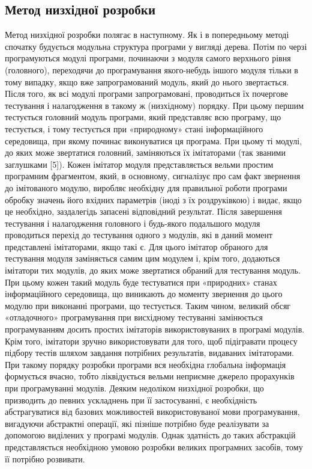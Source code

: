 \documentclass[a4paper,14pt, titlepage]{article}
\begin{document}
\subsection{Метод низхідної розробки}

Метод низхідної розробки полягає в наступному. Як і в попередньому
методі спочатку будується модульна структура програми у вигляді дерева.
Потім по черзі програмуються модулі програми, починаючи з модуля самого
верхнього рівня (головного), переходячи до програмування якого-небудь
іншого модуля тільки в тому випадку, якщо вже запрограмований модуль,
який до нього звертається. Після того, як всі модулі програми
запрограмовані, проводиться їх почергове тестування і налагодження в
такому ж (низхідному) порядку. При цьому першим тестується головний
модуль програми, який представляє всю програму, що тестується, і тому
тестується при «природному» стані інформаційного середовища, при якому
починає виконуватися ця програма. При цьому ті модулі, до яких може
звертатися головний, заміняються їх імітаторами (так званими заглушками
[5]). Кожен імітатор модуля представляється вельми простим
програмним фрагментом, який, в основному, сигналізує про сам факт
звернення до імітованого модулю, виробляє необхідну для правильної
роботи програми обробку значень його вхідних параметрів (іноді з їх
роздруківкою) і видає, якщо це необхідно, заздалегідь запасені
відповідний результат. Після завершення тестування і налагодження
головного і будь-якого подальшого модуля проводиться перехід до
тестування одного з модулів, які в даний момент представлені
імітаторами, якщо такі є. Для цього імітатор обраного для тестування
модуля заміняється самим цим модулем і, крім того, додаються імітатори
тих модулів, до яких може звертатися обраний для тестування модуль. При
цьому кожен такий модуль буде тестуватися при «природних» станах
інформаційного середовища, що виникають до моменту звернення до цього
модулю при виконанні програми, що тестується. Таким чином, великий обсяг
«отладочного» програмування при висхідному тестуванні замінюється
програмуванням досить простих імітаторів використовуваних в програмі
модулів. Крім того, імітатори зручно використовувати для того, щоб
підігравати процесу підбору тестів шляхом завдання потрібних
результатів, видаваних імітаторами. При такому порядку розробки програми
вся необхідна глобальна інформація формується вчасно, тобто ліквідується
вельми неприємне джерело прорахунків при програмуванні модулів. Деяким
недоліком низхідної розробки, що призводить до певних ускладнень при її
застосуванні, є необхідність абстрагуватися від базових можливостей
використовуваної мови програмування, вигадуючи абстрактні операції, які
пізніше потрібно буде реалізувати за допомогою виділених у програмі
модулів. Однак здатність до таких абстракцій представляється необхідною
умовою розробки великих програмних засобів, тому її потрібно розвивати.
\end{document}
